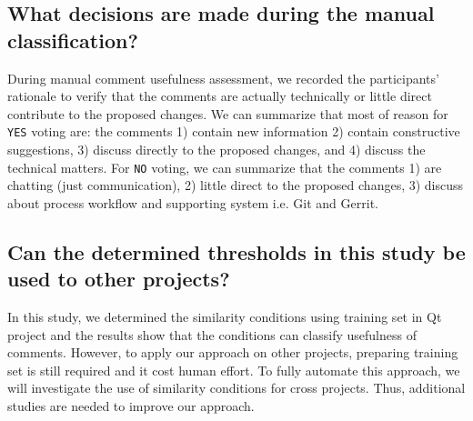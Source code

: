 \subsection*{What decisions are made during the manual classification?}
During manual comment usefulness assessment, we recorded the participants' rationale to verify that the comments are actually technically or little direct contribute to the proposed changes. We can summarize that most of reason for \texttt{YES} voting are: the comments 1) contain new information 2) contain constructive suggestions, 3) discuss directly to the proposed changes, and 4) discuss the technical matters. For \texttt{NO} voting, we can summarize that the comments 1) are chatting (just communication), 2) little direct to the proposed changes, 3) discuss about process workflow and supporting system i.e. Git and Gerrit.
%
%
%

\subsection{Can the determined thresholds in this study be used to other projects?} 
In this study, we determined the similarity conditions using training set in Qt project and the results show that the conditions can classify usefulness of comments. However, to apply our approach on other projects, preparing training set is still required and it cost human effort. To fully automate this approach, we will investigate the use of similarity conditions for cross projects. Thus, additional studies are needed to improve our approach. 

